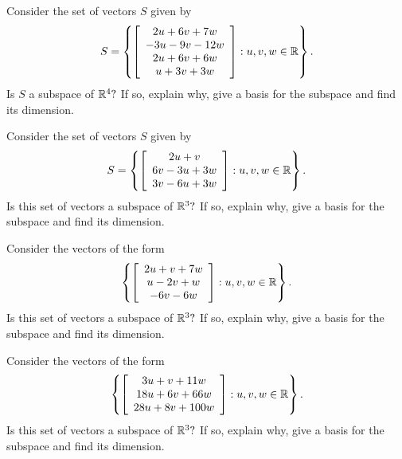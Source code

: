 \begin{enumialphparenastyle}
\begin{ex} Consider the set of vectors $S$ given by 
\begin{equation*}
S = 
\left\{ \left[
\begin{array}{c}
2u+6v+7w \\ 
-3u-9v-12w \\ 
2u+6v+6w \\ 
u+3v+3w
\end{array}
\right] :u,v,w\in \mathbb{R}\right\} .
\end{equation*}
Is $S$ a subspace of $\mathbb{R}^{4}?$ If so, explain why,
give a basis for the subspace and find its dimension.
\end{ex}

\begin{ex} Consider the set of vectors $S$ given by 
\begin{equation*}
S = 
\left\{ \left[ 
\begin{array}{c}
2u+v \\ 
6v-3u+3w \\ 
3v-6u+3w
\end{array}
\right] :u,v,w\in \mathbb{R}\right\} .
\end{equation*}
Is this set of vectors a subspace of $\mathbb{R}^{3}?$ If so, explain why,
give a basis for the subspace and find its dimension.
\end{ex}

\begin{ex} Consider the vectors of the form 
\begin{equation*}
\left\{ \left[
\begin{array}{c}
2u+v+7w \\ 
u-2v+w \\ 
-6v-6w
\end{array}
\right] :u,v,w\in \mathbb{R}\right\} .
\end{equation*}
Is this set of vectors a subspace of $\mathbb{R}^{3}?$ If so, explain why,
give a basis for the subspace and find its dimension.
\end{ex}

\begin{ex} Consider the vectors of the form 
\begin{equation*}
\left\{ \left[ 
\begin{array}{c}
3u+v+11w \\ 
18u+6v+66w \\ 
28u+8v+100w
\end{array}
\right] :u,v,w\in \mathbb{R}\right\} .
\end{equation*}
Is this set of vectors a subspace of $\mathbb{R}^{3}?$ If so, explain why,
give a basis for the subspace and find its dimension.
\end{ex}


\end{enumialphparenastyle}
